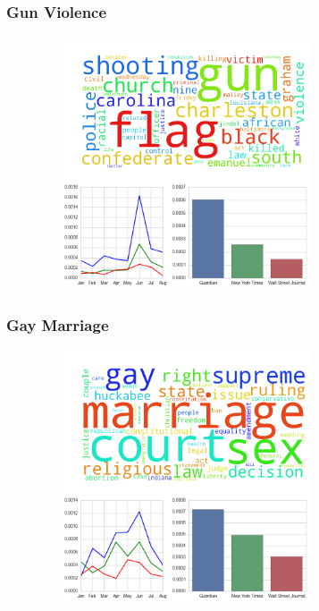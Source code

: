 \documentclass[11pt]{beamer}
\begin{document}

\begin{frame}
\frametitle{Gun Violence}

\begin{figure}
\centering
\includegraphics[width=85mm,height=75mm]{figures/source_topic12.png}
\end{figure} 

\end{frame}


\begin{frame}
\frametitle{Gay Marriage}

\begin{figure}
\centering
\includegraphics[width=85mm,height=75mm]{figures/source_topic9.png}
\end{figure} 

\end{frame}
\end{document}
